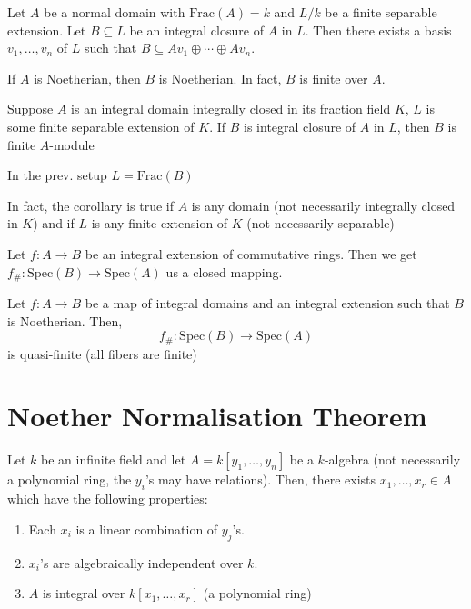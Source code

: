 \documentclass[oneside, 12pt]{scrbook}
\newcommand{\spec}{\mathrm{Spec}}
\theoremstyle{theorem}
\begin{document}
\begin{theorem}
Let $A$ be a normal domain with $\mathrm{Frac}(A)=k$ and $L/k$ be a finite separable extension. Let $B \subseteq L$ be an integral closure of $A$ in $L$. Then there exists a basis $v_{1}, \hdots , v_{n}$ of $L$ such that $B \subseteq Av_{1} \oplus \cdots \oplus Av_{n}$.
\end{theorem}

\begin{corollary}
If $A$ is Noetherian, then $B$ is Noetherian. In fact, $B$ is finite over $A$.
\end{corollary}

\begin{proposition}
Suppose $A$ is an integral domain integrally closed in its fraction field $K$, $L$ is some finite separable extension of $K$. If $B$ is integral closure of $A$ in $L$, then $B$ is finite $A$-module
\end{proposition}

\begin{corollary}
In the prev. setup $L = \mathrm{Frac}(B)$
\end{corollary}

\begin{remark}
In fact, the corollary is true if $A$ is any domain (not necessarily integrally closed in $K$) and if $L$ is any finite extension of $K$ (not necessarily separable)
\end{remark}

\begin{proposition}
Let $f: A\rightarrow B$ be an integral extension of commutative rings. Then we get $f_{\#}: \spec(B) \rightarrow \spec(A)$ us a closed mapping.
\end{proposition}

\begin{proposition}
Let $f: A \rightarrow B$ be a map of integral domains and an integral extension such that $B$ is Noetherian. Then, $$f_{\#} : \spec(B) \rightarrow \spec(A)$$ is quasi-finite (all fibers are finite)
\end{proposition}


\section{Noether Normalisation Theorem}

\begin{theorem}
Let $k$ be an infinite field and let $A = k[y_{1}, \hdots , y_{n}]$ be a $k$-algebra (not necessarily a polynomial ring, the $y_{i}$'s may have relations). Then, there exists $x_{1}, \hdots , x_{r} \in A$ which have the following properties:
\begin{enumerate}
\item Each $x_{i}$ is a linear combination of $y_{j}$'s.
\item $x_{i}$'s are algebraically independent over $k$.
\item $A$ is integral over $k[x_{1}, \hdots , x_{r}]$ (a polynomial ring)
\end{enumerate}
\end{theorem}
\end{document}
